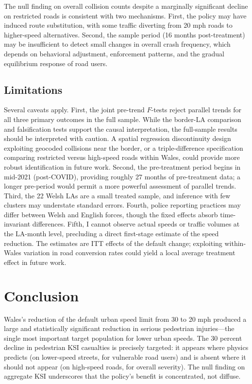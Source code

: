 \documentclass[12pt]{article}
\begin{document}
The null finding on overall collision counts despite a marginally significant decline on restricted roads is consistent with two mechanisms. First, the policy may have induced route substitution, with some traffic diverting from 20 mph roads to higher-speed alternatives. Second, the sample period (16 months post-treatment) may be insufficient to detect small changes in overall crash frequency, which depends on behavioral adjustment, enforcement patterns, and the gradual equilibrium response of road users.

\subsection{Limitations}

Several caveats apply. First, the joint pre-trend $F$-tests reject parallel trends for all three primary outcomes in the full sample. While the border-LA comparison and falsification tests support the causal interpretation, the full-sample results should be interpreted with caution. A spatial regression discontinuity design exploiting geocoded collisions near the border, or a triple-difference specification comparing restricted versus high-speed roads within Wales, could provide more robust identification in future work. Second, the pre-treatment period begins in mid-2021 (post-COVID), providing roughly 27 months of pre-treatment data; a longer pre-period would permit a more powerful assessment of parallel trends. Third, the 22 Welsh LAs are a small treated sample, and inference with few clusters may understate standard errors. Fourth, police reporting practices may differ between Welsh and English forces, though the fixed effects absorb time-invariant differences. Fifth, I cannot observe actual speeds or traffic volumes at the LA-month level, precluding a direct first-stage estimate of the speed reduction. The estimates are ITT effects of the default change; exploiting within-Wales variation in road conversion rates could yield a local average treatment effect in future work.


\section{Conclusion}

Wales's reduction of the default urban speed limit from 30 to 20 mph produced a large and statistically significant reduction in serious pedestrian injuries---the single most important target population for lower urban speeds. The 30 percent decline in pedestrian KSI casualties is precisely targeted: it appears where physics predicts (on lower-speed streets, for vulnerable road users) and is absent where it should not appear (on high-speed roads, for overall severity). The null finding on aggregate KSI underscores that the policy's benefit is concentrated, not diffuse.
\end{document}
